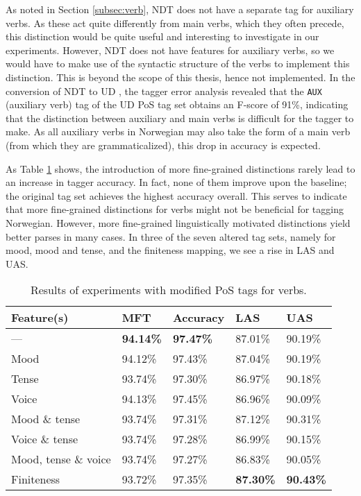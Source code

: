 \documentclass[a4paper,12pt,english]{book}
\begin{document}
As noted in Section \ref{subsec:verb}, NDT does not have a separate tag for
auxiliary verbs. As these act quite differently from main verbs, which they
often precede, this distinction would be quite useful and interesting to
investigate in our experiments. However, NDT does not have features for
auxiliary verbs, so we would have to make use of the syntactic structure of the
verbs to implement this distinction. This is beyond the scope of this thesis,
hence not implemented. In the conversion of NDT to UD \cite{Ovr:Hoh:16}, the
tagger error analysis revealed that the \texttt{AUX} (auxiliary verb) tag of the
UD PoS tag set obtains an F-score of 91\%, indicating that the distinction
between auxiliary and main verbs is difficult for the tagger to make. As all
auxiliary verbs in Norwegian may also take the form of a main verb (from which
they are grammaticalized), this drop in accuracy is expected.

As Table \ref{verbresults} shows, the introduction of more fine-grained
distinctions rarely lead to an increase in tagger accuracy. In fact, none of
them improve upon the baseline; the original tag set achieves the highest
accuracy overall. This serves to indicate that more fine-grained distinctions
for verbs might not be beneficial for tagging Norwegian. However, more
fine-grained linguistically motivated distinctions yield better parses in many
cases. In three of the seven altered tag sets, namely for mood, mood and tense,
and the finiteness mapping, we see a rise in LAS and UAS.

\begin{table}
    \centering
    \smaller[0.5]
    \begin{tabular}{@{}lllll@{}}
        \toprule
        \textbf{Feature(s)} & \textbf{MFT} & \textbf{Accuracy} &
        \textbf{LAS} & \textbf{UAS} \\
        \midrule
        --- & \textbf{94.14\%} & \textbf{97.47\%} & 87.01\% & 90.19\% \\
        Mood & 94.12\% & 97.43\% & 87.04\% & 90.19\% \\
        Tense & 93.74\% & 97.30\% & 86.97\% & 90.18\% \\
        Voice & 94.13\% & 97.45\% & 86.96\% & 90.09\% \\
        Mood \& tense & 93.74\% & 97.31\% & 87.12\% & 90.31\% \\
        Voice \& tense & 93.74\% & 97.28\% & 86.99\% & 90.15\% \\
        Mood, tense \& voice & 93.74\% & 97.27\% & 86.83\% & 90.05\% \\
        Finiteness & 93.72\% & 97.35\% & \textbf{87.30\%} &
        \textbf{90.43\%} \\
        \bottomrule
    \end{tabular}
    \caption{Results of experiments with modified PoS tags for verbs.}
    \label{verbresults}
\end{table}
\end{document}
